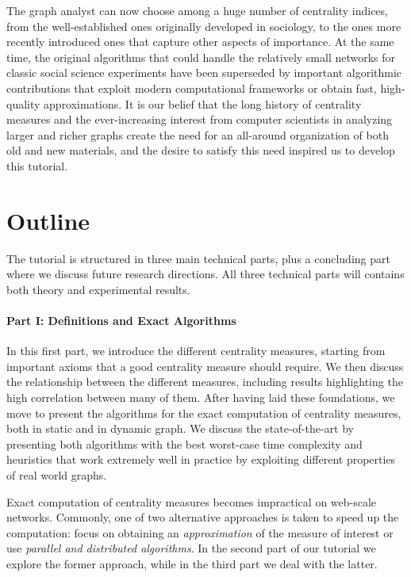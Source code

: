 \documentclass[pdfpagelabels=false]{sig-alternate-2013} %
\begin{document}
The graph analyst can now choose among a huge number of centrality indices, from
the well-established ones originally developed in sociology, to the ones more
recently introduced ones that capture other aspects of importance.  At the same
time, the original algorithms that could handle the relatively small networks
for classic social science experiments have been superseded by important
algorithmic contributions that exploit modern computational frameworks or
obtain fast, high-quality approximations. It is our belief that the long history of
centrality measures and the ever-increasing interest from computer
scientists in analyzing larger and richer graphs create the need for an
all-around organization of both old and new materials, and the desire to
satisfy this need inspired us to develop this tutorial.

\section{Outline}
The tutorial is structured in three main technical parts, plus a concluding part
where we discuss future research directions. All three technical parts will
contains both theory and experimental results.

\paragraph{Part I: Definitions and Exact Algorithms}
In this first part, we introduce the different centrality measures, starting
from important axioms that a good centrality measure should require. We then
discuss the relationship between the different measures, including
results highlighting the high correlation between many of them. After having
laid these foundations, we move to present the algorithms for the exact
computation of centrality measures, both in static and in dynamic graph. We
discuss the state-of-the-art by presenting both algorithms with the best
worst-case time complexity and heuristics that work extremely well in practice
by exploiting different properties of real world graphs.

Exact computation of centrality measures becomes impractical on web-scale
networks. Commonly, one of two alternative approaches is taken to speed up the
computation: focus on obtaining an \emph{approximation} of the measure of
interest or use \emph{parallel and distributed algorithms}. In the second
part of our tutorial we explore the former approach, while in the third part we
deal with the latter.
\end{document}

